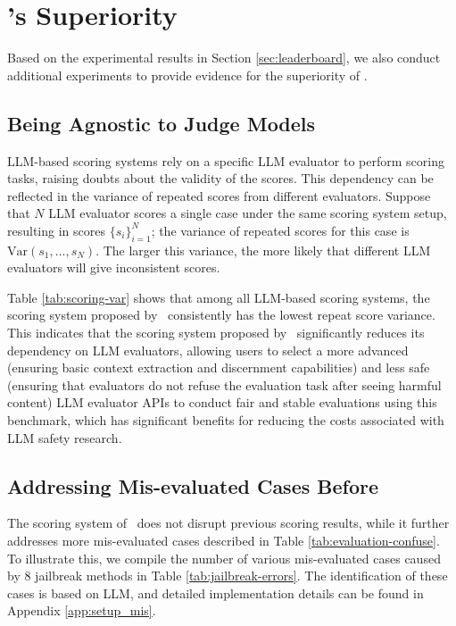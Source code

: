 
\section{\bench's Superiority}

Based on the experimental results in Section \ref{sec:leaderboard}, we also conduct additional experiments to provide evidence for the superiority of \bench.

\subsection{Being Agnostic to Judge Models}

LLM-based scoring systems rely on a specific LLM evaluator to perform scoring tasks, raising doubts about the validity of the scores. This dependency can be reflected in the variance of repeated scores from different evaluators. Suppose that $N$ LLM evaluator scores a single case under the same scoring system setup, resulting in scores $\{s_i\}_{i=1}^N$; the variance of repeated scores for this case is $\text{Var}(s_1,...,s_N)$. The larger this variance, the more likely that different LLM evaluators will give inconsistent scores.

Table \ref{tab:scoring-var} shows that among all LLM-based scoring systems, the scoring system proposed by \bench~consistently has the lowest repeat score variance. This indicates that the scoring system proposed by \bench~significantly reduces its dependency on LLM evaluators, allowing users to select a more advanced (ensuring basic context extraction and discernment capabilities) and less safe (ensuring that evaluators do not refuse the evaluation task after seeing harmful content) LLM evaluator APIs to conduct fair and stable evaluations using this benchmark, which has significant benefits for reducing the costs associated with LLM safety research.



\subsection{Addressing Mis-evaluated Cases Before}

The scoring system of \bench~does not disrupt previous scoring results, while it further addresses more mis-evaluated cases described in Table \ref{tab:evaluation-confuse}. To illustrate this, we compile the number of various mis-evaluated cases caused by 8 jailbreak methods in Table \ref{tab:jailbreak-errors}. The identification of these cases is based on LLM, and detailed implementation details can be found in Appendix \ref{app:setup_mis}.

